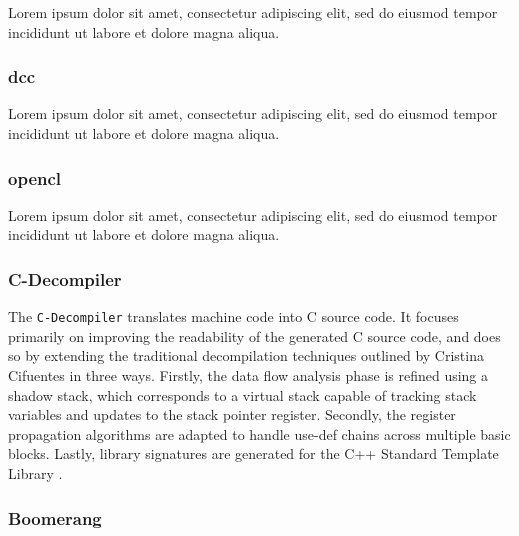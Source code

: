 \documentclass[12pt, a4paper]{article}
\begin{document}
Lorem ipsum dolor sit amet, consectetur adipiscing elit, sed do eiusmod tempor incididunt ut labore et dolore magna aliqua.


\subsubsection{dcc}

Lorem ipsum dolor sit amet, consectetur adipiscing elit, sed do eiusmod tempor incididunt ut labore et dolore magna aliqua.

\cite{rev_comp}


\subsubsection{opencl}

Lorem ipsum dolor sit amet, consectetur adipiscing elit, sed do eiusmod tempor incididunt ut labore et dolore magna aliqua.

\cite{decomp_llvm}


\subsubsection{C-Decompiler}

The \texttt{C-Decompiler} translates machine code into C source code. It focuses primarily on improving the readability of the generated C source code, and does so by extending the traditional decompilation techniques outlined by Cristina Cifuentes in three ways. Firstly, the data flow analysis phase is refined using a shadow stack, which corresponds to a virtual stack capable of tracking stack variables and updates to the stack pointer register. Secondly, the register propagation algorithms are adapted to handle use-def chains across multiple basic blocks. Lastly, library signatures are generated for the C++ Standard Template Library \cite{readable_decomp}.


\subsubsection{Boomerang}
\end{document}
